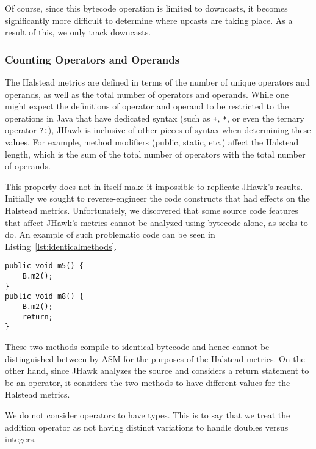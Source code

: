 Of course, since this bytecode operation is limited to downcasts, it becomes significantly more difficult to determine where upcasts are taking place. As a result of this, we only track downcasts.

\subsubsection{Counting Operators and Operands}

The Halstead metrics are defined in terms of the number of unique operators and operands, as well as the total number of operators and operands. While one might expect the definitions of operator and operand to be restricted to the operations in Java that have dedicated syntax (such as \texttt{+}, \texttt{*}, or even the ternary operator \texttt{?:}), JHawk is inclusive of other pieces of syntax when determining these values. For example, method modifiers (public, static, etc.) affect the Halstead length, which is the sum of the total number of operators with the total number of operands.

This property does not in itself make it impossible to replicate JHawk's results. Initially we sought to reverse-engineer the code constructs that had effects on the Halstead metrics. Unfortunately, we discovered that some source code features that affect JHawk's metrics cannot be analyzed using bytecode alone, as \mt{} seeks to do. An example of such problematic code can be seen in Listing~\ref{lst:identicalmethods}.

\begin{lstlisting}[frame=single,caption=Methods with identical bytecode,label=lst:identicalmethods]
public void m5() {
    B.m2();
}
public void m8() {
    B.m2();
    return;
}
\end{lstlisting}

These two methods compile to identical bytecode and hence cannot be distinguished between by ASM for the purposes of the Halstead metrics. On the other hand, since JHawk analyzes the source and considers a return statement to be an operator, it considers the two methods to have different values for the Halstead metrics.

We do not consider operators to have types. This is to say that we treat the addition operator as not having distinct variations to handle doubles versus integers.

